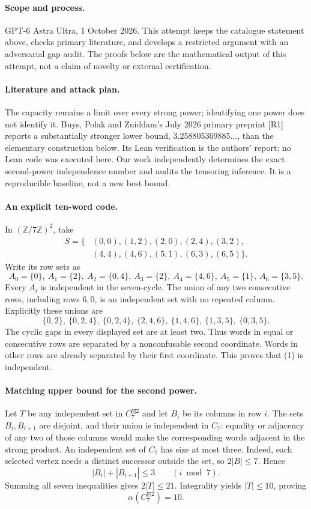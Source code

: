 \documentclass[11pt,a4paper]{article}
\begin{document}
\paragraph{Scope and process.}
GPT-6 Astra Ultra, 1 October 2026. This attempt keeps the catalogue statement above, checks primary literature, and develops a restricted argument with an adversarial gap audit. The proofs below are the mathematical output of this attempt, not a claim of novelty or external certification.

\paragraph{Literature and attack plan.}
The capacity remains a limit over every strong power; identifying one power does not identify it. Buys, Polak and Zuiddam's July 2026 primary preprint [R1] reports a substantially stronger lower bound, $3.258805369885\ldots$, than the elementary construction below. Its Lean verification is the authors' report; no Lean code was executed here. Our work independently determines the exact second-power independence number and audits the tensoring inference. It is a reproducible baseline, not a new best bound.

\paragraph{An explicit ten-word code.}
In $(\mathbb Z/7\mathbb Z)^2$, take
\[
\begin{split}
S=\{&(0,0),(1,2),(2,0),(2,4),(3,2),\\
     &(4,4),(4,6),(5,1),(6,3),(6,5)\}.
\end{split} \tag{1}
\]
Write its row sets as
\[
 A_0=\{0\},\ A_1=\{2\},\ A_2=\{0,4\},\ A_3=\{2\},\
 A_4=\{4,6\},\ A_5=\{1\},\ A_6=\{3,5\}.
\]
Every $A_i$ is independent in the seven-cycle. The union of any two consecutive rows, including rows $6,0$, is an independent set with no repeated column. Explicitly these unions are
\[
 \{0,2\},\ \{0,2,4\},\ \{0,2,4\},\ \{2,4,6\},\
 \{1,4,6\},\ \{1,3,5\},\ \{0,3,5\}.
\]
The cyclic gaps in every displayed set are at least two. Thus words in equal or consecutive rows are separated by a nonconfusable second coordinate. Words in other rows are already separated by their first coordinate. This proves that (1) is independent.

\paragraph{Matching upper bound for the second power.}
Let $T$ be any independent set in $C_7^{\boxtimes2}$ and let $B_i$ be its columns in row $i$. The sets $B_i,B_{i+1}$ are disjoint, and their union is independent in $C_7$: equality or adjacency of any two of those columns would make the corresponding words adjacent in the strong product. An independent set of $C_7$ has size at most three. Indeed, each selected vertex needs a distinct successor outside the set, so $2|B|\le7$.
Hence
\[
 |B_i|+|B_{i+1}|\le3\qquad(i\bmod7).
\]
Summing all seven inequalities gives $2|T|\le21$. Integrality yields $|T|\le10$, proving
\[
 \alpha(C_7^{\boxtimes2})=10. \tag{2}
\]
\end{document}
